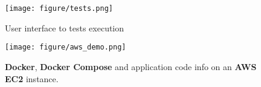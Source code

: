 \documentclass[conference]{IEEEtran}
\begin{document}
\begin{figure}[htb]\label{fig:tests}
\texttt{[image: figure/tests.png]}
\caption{User interface to tests execution}
\end{figure}

\begin{figure}[htb]\label{fig:aws}
\texttt{[image: figure/aws\_demo.png]}
\caption{\textbf{Docker}, \textbf{Docker Compose} and application code info on an \textbf{AWS EC2} instance.}
\end{figure}
\printbibliography



\end{document}
